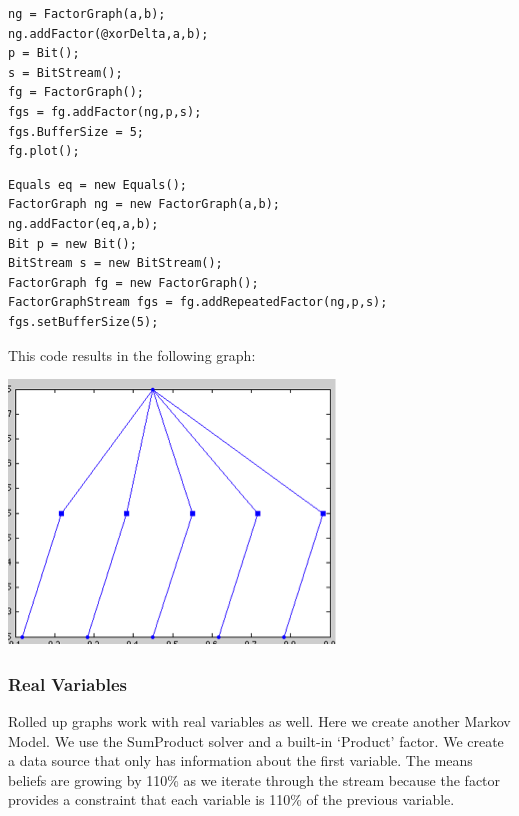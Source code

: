 \ifmatlab
\begin{lstlisting}
ng = FactorGraph(a,b);
ng.addFactor(@xorDelta,a,b);
p = Bit();
s = BitStream();
fg = FactorGraph();
fgs = fg.addFactor(ng,p,s);
fgs.BufferSize = 5;
fg.plot();
\end{lstlisting}
\fi

\ifjava
\begin{lstlisting}
Equals eq = new Equals();
FactorGraph ng = new FactorGraph(a,b);
ng.addFactor(eq,a,b);
Bit p = new Bit();
BitStream s = new BitStream();
FactorGraph fg = new FactorGraph();
FactorGraphStream fgs = fg.addRepeatedFactor(ng,p,s);
fgs.setBufferSize(5);
\end{lstlisting}
\fi


This code results in the following graph:

\includegraphics{images/RolledUpParameter.png}

\subsubsection{Real Variables}

Rolled up graphs work with real variables as well.  Here we create another Markov Model.  We use the SumProduct solver and a built-in `Product' factor.  We create a data source that only has information about the first variable.  The means beliefs are growing by 110\% as we iterate through the stream because the factor provides a constraint that each variable is 110\% of the previous variable.

